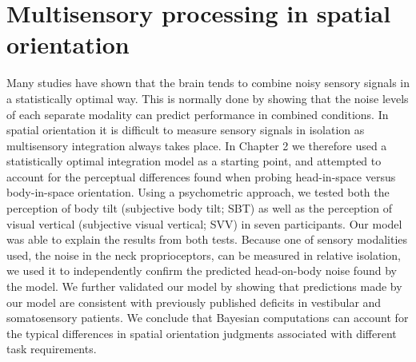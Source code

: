 \section{Multisensory processing in spatial orientation}
Many studies have shown that the brain tends to combine noisy sensory signals in a statistically optimal way. This is normally done by showing that the noise levels of each separate modality can predict performance in combined conditions. In spatial orientation it is difficult to measure sensory signals in isolation as multisensory integration always takes place. In Chapter 2 we therefore used a statistically optimal integration model as a starting point, and attempted to account for the perceptual differences found when probing head-in-space versus body-in-space orientation. Using a psychometric approach, we tested both the perception of body tilt (subjective body tilt; SBT) as well as the perception of visual vertical (subjective visual vertical; SVV) in seven participants. Our model was able to explain the results from both tests. Because one of sensory modalities used, the noise in the neck proprioceptors, can be measured in relative isolation, we used it to independently confirm the predicted head-on-body noise found by the model. We further validated our model by showing that predictions made by our model are consistent with previously published deficits in vestibular and somatosensory patients. We conclude that Bayesian computations can account for the typical differences in spatial orientation judgments associated with different task requirements.

